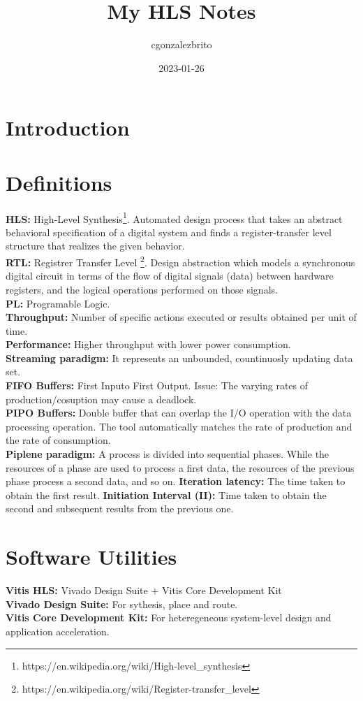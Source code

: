 \documentclass{article}
\title{My HLS Notes}
\date{2023-01-26}
\author{cgonzalezbrito}
\newcommand\tab[1][1cm]{\hspace*{#1}}
\begin{document}
  \maketitle
  \newpage
  \section{Introduction}
  
  \iffalse TODO: \fi

  \section{Definitions}

  \textbf{HLS:} High-Level Synthesis\footnote{\label{HLS}https://en.wikipedia.org/wiki/High-level_synthesis}. Automated design process that takes an abstract behavioral specification of a digital system and finds a register-transfer level structure that realizes the given behavior.\\
  \textbf{RTL:} Registrer Transfer Level \footnote{\label{RTL}https://en.wikipedia.org/wiki/Register-transfer_level}. Design abstraction which models a synchronous digital circuit in terms of the flow of digital signals (data) between hardware registers, and the logical operations performed on those signals.\\
  \textbf{PL:} Programable Logic.\\
  \textbf{Throughput:} Number of specific actions executed or results obtained per unit of time.\\
  \textbf{Performance:} Higher throughput with lower power consumption.\\
  \textbf{Streaming paradigm:} It represents an unbounded, countinuosly updating data set.\\
  \tab \textbf{FIFO Buffers:} First Inputo First Output. Issue: The varying rates of production/cosuption may cause a deadlock.\\
  \tab \textbf{PIPO Buffers:} Double buffer that can overlap the I/O operation with the data processing operation. The tool automatically matches the rate of production and the rate of consumption.\\
  \textbf{Piplene paradigm:} A process is divided into sequential phases. While the resources of a phase are used to process a first data, the resources of the previous phase process a second data, and so on.
  \tab \textbf{Iteration latency:} The time taken to obtain the first result.
  \tab \textbf{Initiation Interval (II):}  Time taken to obtain the second and subsequent results from the previous one.

    \section{Software Utilities}

  \textbf{Vitis HLS:} Vivado Design Suite + Vitis Core Development Kit\\
  \textbf{Vivado Design Suite:} For sythesis, place and route.\\
  \textbf{Vitis Core Development Kit:} For heteregeneous system-level design and application acceleration.\\
\end{document}

